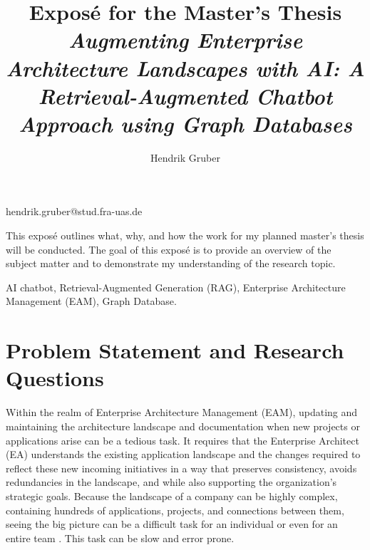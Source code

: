 \documentclass[english]{lni}
\begin{document}
\title[Ein Kurztitel]{Exposé for the Master's Thesis \textit{Augmenting Enterprise Architecture Landscapes with AI: A Retrieval-Augmented Chatbot Approach using Graph Databases}}
 \author[1]{Hendrik Gruber}{hendrik.gruber@stud.fra-uas.de}{}
\maketitle



This exposé outlines what, why, and how the work for my planned master's thesis will be conducted. The goal of this exposé is to provide an overview of the subject matter and to demonstrate my understanding of the research topic.

\begin{keywords}
AI chatbot, Retrieval-Augmented Generation (RAG), Enterprise Architecture Management (EAM), Graph Database.
\end{keywords}


\section{Problem Statement and Research Questions}
Within the realm of Enterprise Architecture Management (EAM), updating and maintaining the architecture landscape and documentation when new projects or applications arise can be a tedious task. It requires that the Enterprise Architect (EA) understands the existing application landscape and the changes required to reflect these new incoming initiatives in a way that preserves consistency, avoids redundancies in the landscape, and while also supporting the organization's strategic goals. Because the landscape of a company can be highly complex, containing hundreds of applications, projects, and connections between them, seeing the big picture can be a difficult task for an individual or even for an entire team \cite{jung2021masterclass}. This task can be slow and error prone.
\end{document}
